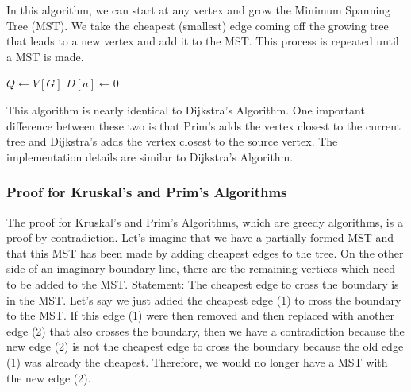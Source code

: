 \documentclass[english, 10pt]{article}
\begin{document}
In this algorithm, we can start at any vertex and grow the Minimum Spanning Tree (MST). We take the cheapest (smallest) edge coming off the growing tree that leads to a new vertex and add it to the MST. This process is repeated until a MST is made. 

\begin{algorithm}[H]
    $Q \gets V[G]$ 
    {}
    $D[a] \gets 0$\;
    
\end{algorithm}
\BlankLine

This algorithm is nearly identical to Dijkstra's Algorithm. One important difference between these two is that Prim's adds the vertex closest to the current tree and Dijkstra's adds the vertex closest to the source vertex. 
\newline
\newline
The implementation details are similar to Dijkstra's Algorithm.

\subsubsection{Proof for Kruskal's and Prim's Algorithms}

The proof for Kruskal's and Prim's Algorithms, which are greedy algorithms, is a proof by contradiction. Let's imagine that we have a partially formed MST and that this MST has been made by adding cheapest edges to the tree. On the other side of an imaginary boundary line, there are the remaining vertices which need to be added to the MST. 
\newline
\newline
Statement: The cheapest edge to cross the boundary is in the MST.
\newline
Let's say we just added the cheapest edge (1) to cross the boundary to the MST. If this edge (1) were then removed and then replaced with another edge (2) that also crosses the boundary, then we have a contradiction because the new edge (2) is not the cheapest edge to cross the boundary because the old edge (1) was already the cheapest. Therefore, we would no longer have a MST with the new edge (2). 
\end{document}
